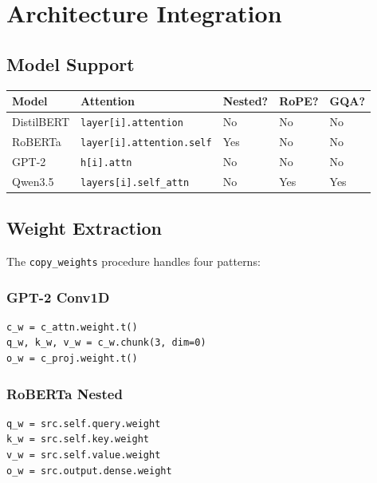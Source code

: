 \section{Architecture Integration}

\subsection{Model Support}

\begin{table}[H]
\centering
\small
\begin{tabular}{lllll}
\toprule
\textbf{Model} & \textbf{Attention} & \textbf{Nested?} & \textbf{RoPE?} & \textbf{GQA?} \\
\midrule
DistilBERT & \texttt{layer[i].attention} & No & No & No \\
RoBERTa & \texttt{layer[i].attention.self} & Yes & No & No \\
GPT-2 & \texttt{h[i].attn} & No & No & No \\
Qwen3.5 & \texttt{layers[i].self\_attn} & No & Yes & Yes \\
\bottomrule
\end{tabular}
\end{table}

\subsection{Weight Extraction}

The \texttt{copy\_weights} procedure handles four patterns:

\subsubsection{GPT-2 Conv1D}

\begin{lstlisting}
c_w = c_attn.weight.t()
q_w, k_w, v_w = c_w.chunk(3, dim=0)
o_w = c_proj.weight.t()
\end{lstlisting}

\subsubsection{RoBERTa Nested}

\begin{lstlisting}
q_w = src.self.query.weight
k_w = src.self.key.weight
v_w = src.self.value.weight
o_w = src.output.dense.weight
\end{lstlisting}

